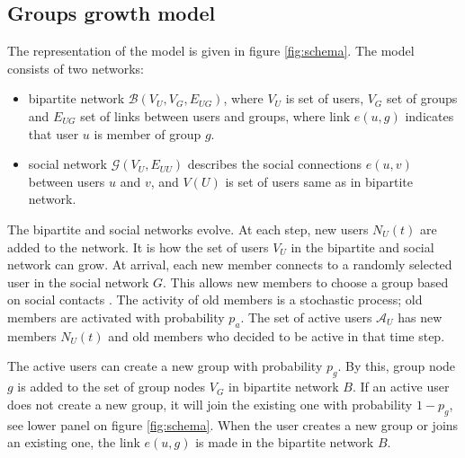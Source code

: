 \subsection{Groups growth model}

The representation of the model is given in figure \ref{fig:schema}. The model consists of two networks:
\begin{itemize}
	\item bipartite network $\mathcal{B}(V_{U}, V_{G}, E_{UG})$, where $V_U$ is set of users, $V_G$ set of groups and $E_{UG}$ set of links between users and groups, where link $e(u,g)$ indicates that user $u$ is member of group $g$.
	\item social network $\mathcal{G}(V_{U},E_{UU})$ describes the social connections $e(u, v)$ between users $u$ and $v$, and  $V(U)$ is set of users same as in bipartite network. 
\end{itemize}

The bipartite and social networks evolve. At each step, new users $N_U(t)$ are added to the network. It is how the set of users $V_U$ in the bipartite and social network can grow. At arrival, each new member connects to a randomly selected user in the social network $G$. This allows new members to choose a group based on social contacts \cite{kairam2012life}. The activity of old members is a stochastic process; old members are activated with probability $p_a$. The set of active users $\mathcal{A}_{U}$ has new members $N_U(t)$ and old members who decided to be active in that time step.

The active users can create a new group with probability $p_g$. By this, group node $g$ is added to the set of group nodes $V_G$ in bipartite network $B$. If an active user does not create a new group, it will join the existing one with probability $1-p_g$, see lower panel on figure \ref{fig:schema}. When the user creates a new group or joins an existing one, the link $e(u,g)$ is made in the bipartite network $B$.


